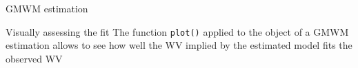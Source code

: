 \documentclass[envcountsect,usenames,dvipsnames]{beamer}
\theoremstyle{mystyle}
\begin{document}
\begin{frame}{GMWM estimation}

\begin{block}{Visually assessing the fit}
The function {\tt plot()} applied to the object of a GMWM estimation allows to see how well the WV implied by the estimated model fits the observed WV
\end{block}

	\begin{figure}
	  \centering
	\end{figure}
\end{frame}
\end{document}
